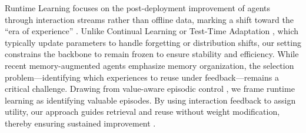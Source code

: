 \documentclass{article}
\theoremstyle{plain}
\theoremstyle{definition}
\theoremstyle{remark}
\begin{document}
Runtime Learning focuses on the post-deployment improvement of agents through interaction streams rather than offline data, marking a shift toward the ``era of experience'' \citep{silver2025era_of_experience}. Unlike Continual Learning \citep{parisi2019continual,wu2024continuallearninglargelanguage} or Test-Time Adaptation \citep{sun2020test,wang2020tent,liang2025comprehensive}, which typically update parameters to handle forgetting or distribution shifts, our setting constrains the backbone to remain frozen to ensure stability and efficiency. While recent memory-augmented agents \citep{zheng2025lifelong,wei2025evo,zhou2025rulearena} emphasize memory organization, the selection problem---identifying which experiences to reuse under feedback---remains a critical challenge. Drawing from value-aware episodic control \citep{tulving1972episodic,mcclelland1995there}, we frame runtime learning as identifying valuable episodes. By using interaction feedback to assign utility, our approach guides retrieval and reuse without weight modification, thereby ensuring sustained improvement \citep{pritzel2017neural}.
\end{document}

